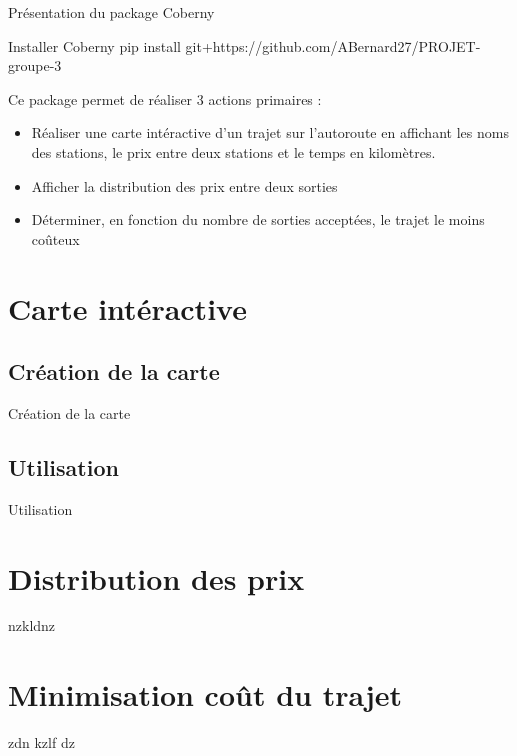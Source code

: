 \documentclass{beamer}
\begin{document}
\begin{frame}[fragile]{Présentation du package Coberny}
\begin{block}{Installer Coberny}
pip install git+https://github.com/ABernard27/PROJET-groupe-3
\end{block}
Ce package permet de réaliser 3 actions primaires : \newline
\begin{itemize}
\item Réaliser une carte intéractive d'un trajet sur l'autoroute en affichant les noms des stations, le prix entre deux stations et le temps en kilomètres.
\item Afficher la distribution des prix entre deux sorties
\item Déterminer, en fonction du nombre de sorties acceptées, le trajet le moins coûteux
\end{itemize}
\end{frame}



\section{Carte intéractive}
\subsection{Création de la carte}

\begin{frame}[fragile]{Création de la carte}
\end{frame}

\subsection{Utilisation}
\begin{frame}[fragile]{Utilisation}
\end{frame}


\section{Distribution des prix}
\begin{frame}
nzkldnz
\end{frame}

\section{Minimisation coût du trajet}
\begin{frame}
zdn kzlf dz
\end{frame}
\end{document}
